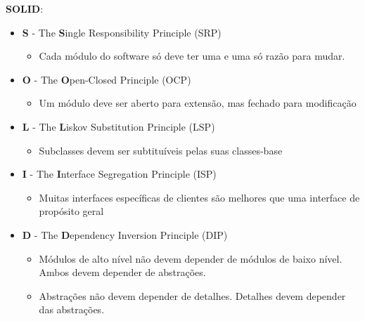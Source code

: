 \documentclass[../resumosLPOO.tex]{subfiles}
\begin{document}
 

\textbf{SOLID}:
\begin{itemize}
    \item \textbf{S} - The \textbf{S}ingle Responsibility Principle (SRP)
    \begin{itemize}
        \item Cada módulo do software só deve ter uma e uma só razão para mudar.
    \end{itemize}
    \item \textbf{O} - The \textbf{O}pen-Closed Principle (OCP)
    \begin{itemize}
        \item Um módulo deve ser aberto para extensão, mas fechado para modificação
    \end{itemize}
    \item \textbf{L} - The \textbf{L}iskov Substitution Principle (LSP)
    \begin{itemize}
        \item Subclasses devem ser subtituíveis pelas suas classes-base
    \end{itemize}
    \item \textbf{I} - The \textbf{I}nterface Segregation Principle (ISP)
    \begin{itemize}
        \item Muitas interfaces específicas de clientes são melhores que uma interface de propósito geral
    \end{itemize}
    \item \textbf{D} - The \textbf{D}ependency Inversion Principle (DIP)
    \begin{itemize}
        \item Módulos de alto nível não devem depender de módulos de baixo nível. Ambos devem depender de abstrações.
        \item Abstrações não devem depender de detalhes. Detalhes devem depender das abstrações.
    \end{itemize}
\end{itemize}

\paragraph{}
\end{document}
